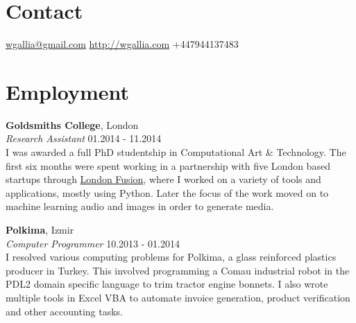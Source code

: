 \documentclass[margin,line,a4paper]{resume}
\begin{document}

\begin{resume}

\section{\mysidestyle Contact}

\hypersetup{urlcolor=Fuchsia}
\href{mailto:wgallia@gmail.com}{wgallia@gmail.com} \hfill
\hypersetup{urlcolor=RoyalBlue}
\href{http://wgallia.com}{http://wgallia.com} \hfill
+447944137483 \\


\section{\mysidestyle Employment}

\textbf{Goldsmiths College}, London \vspace{1mm}\\
\textsl{Research Assistant} \hfill 01.2014 - 11.2014 \vspace{2mm} \\
I was awarded a full PhD studentship in Computational Art \& Technology. The first six months were spent
working in a partnership with five London based startups through
\href{http://www.theworkfoundation.com/Aboutus/London-Creative-and-Digital-Fusion}{London
  Fusion}, where I worked on a variety of tools and applications, mostly using Python. Later the
focus of the work moved on to machine learning audio and images in
order to generate media.


\textbf{Polkima}, Izmir \vspace{1mm}\\
\textsl{Computer Programmer} \hfill 10.2013 - 01.2014 \vspace{2mm} \\
I resolved various computing problems for Polkima, a glass reinforced plastics producer in Turkey. This involved programming a Comau industrial robot in the PDL2
domain specific language to trim tractor engine bonnets. I also wrote multiple tools in Excel VBA to automate invoice generation, product
verification and other accounting tasks.



\end{resume}
\end{document}

